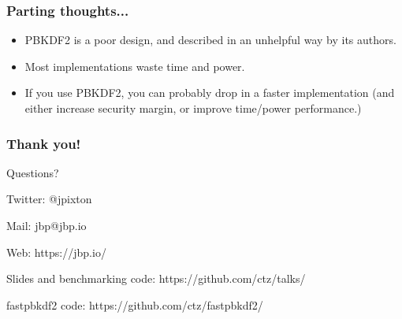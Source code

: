\documentclass[aspectratio=169]{beamer}
\begin{document}
\frame
{
  \frametitle{Parting thoughts...}

  \begin{itemize}
    \item<1-> PBKDF2 is a poor design, and described in an unhelpful way by its authors.
    \item<2-> Most implementations waste time and power.
    \item<3-> If you use PBKDF2, you can probably drop in a faster implementation (and either
              increase security margin, or improve time/power performance.)
  \end{itemize}
}

\frame
{
  \frametitle{Thank you!}
  Questions?

  \vspace{5em}

  Twitter: @jpixton

  Mail: jbp@jbp.io

  Web: https://jbp.io/

  Slides and benchmarking code: https://github.com/ctz/talks/

  fastpbkdf2 code: https://github.com/ctz/fastpbkdf2/
}
\end{document}
